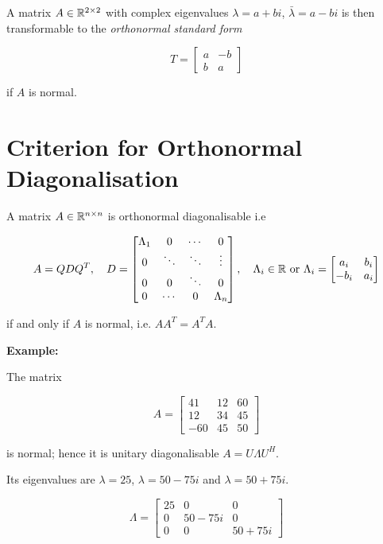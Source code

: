 A matrix \(A \in \mathbb{R}^{2 \times 2}\) with complex eigenvalues \(\lambda = a + bi\), \(\bar{\lambda} = a - bi\) is then 
transformable to the \emph{orthonormal standard form}

\[
    T = 
    \begin{bmatrix}
        a & -b \\
        b & a
    \end{bmatrix}
\]

if \(A\) is normal.

\section{Criterion for Orthonormal Diagonalisation}

A matrix \(A \in \mathbb{R}^{n \times n}\) is orthonormal diagonalisable i.e 

\[
    A = Q D Q^T, \quad D = 
    \begin{bmatrix}
        \Lambda_1 & 0 & \cdots & 0 \\
        0 & \ddots & \ddots & \vdots \\
        0 & 0 & \ddots & 0 \\
        0 & \cdots & 0 & \Lambda_n
    \end{bmatrix}
    ,
    \quad
    \Lambda_i \in \mathbb{R} \text{ or } \Lambda_i 
    =
    \begin{bmatrix}
        a_i & b_i \\
        -b_i & a_i
    \end{bmatrix}
\]

if and only if \(A\) is normal, i.e. \(A A^T = A^T A\).

\textbf{Example:}

The matrix 

\[
    A = 
    \begin{bmatrix}
     41 & 12 & 60 \\ 
     12 & 34 & 45 \\
     -60 & 45 & 50        
    \end{bmatrix} 
\]

is normal; hence it is unitary diagonalisable \(A = U \Lambda U^H\). 

Its eigenvalues are \(\lambda = 25\), \(\lambda = 50 - 75i\) and \(\lambda = 50 + 75i\).

\[
    \Lambda =
    \begin{bmatrix}
        25 & 0 & 0 \\
        0 & 50 - 75i & 0 \\
        0 & 0 & 50 + 75i
    \end{bmatrix}
\]

